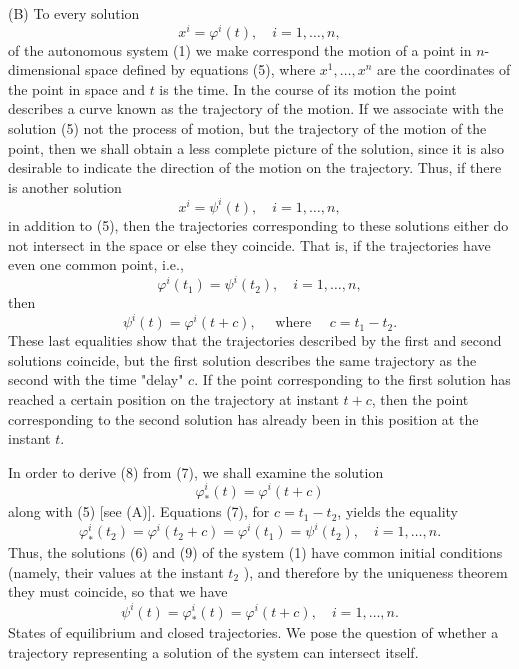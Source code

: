 \documentclass[10pt,a5paper]{book}
\theoremstyle{plain}
\theoremstyle{definition}
\theoremstyle{remark}
\begin{document}
(B) To every solution
\begin{equation*}
x^{i}=\varphi^{i}(t), \quad i=1, \ldots, n, \tag{5}
\end{equation*}
of the autonomous system (1) we make correspond the motion of a point in $n$-dimensional space defined by equations (5), where $x^{1}, \ldots, x^{n}$ are the coordinates of the point in space and $t$ is the time. In the course of its motion the point describes a curve known as the trajectory of the motion. If we associate with the solution (5) not the process of motion, but the trajectory of the motion of the point, then we shall obtain a less complete picture of the solution, since it is also desirable to indicate the direction of the motion on the trajectory. Thus, if there is another solution
\begin{equation*}
x^{i}=\psi^{i}(t), \quad i=1, \ldots, n, \tag{6}
\end{equation*}
in addition to (5), then the trajectories corresponding to these solutions either do not intersect in the space or else they coincide. That is, if the trajectories have even one common point, i.e.,
\begin{equation*}
\varphi^{i}\left(t_{1}\right)=\psi^{i}\left(t_{2}\right), \quad i=1, \ldots, n, \tag{7}
\end{equation*}
then
\begin{equation*}
\psi^{i}(t)=\varphi^{i}(t+c), \quad \text { where } \quad c=t_{1}-t_{2} . \tag{8}
\end{equation*}
These last equalities show that the trajectories described by the first and second solutions coincide, but the first solution describes the same trajectory as the second with the time "delay" $c$. If the point corresponding to the first solution has reached a certain position on the trajectory at instant $t+c$, then the point corresponding to the second solution has already been in this position at the instant $t$.

In order to derive (8) from (7), we shall examine the solution
\begin{equation*}
\varphi_{*}^{i}(t)=\varphi^{i}(t+c) \tag{9}
\end{equation*}
along with (5) [see (A)]. Equations (7), for $c=t_{1}-t_{2}$, yields the equality
\[
\varphi_{*}^{i}\left(t_{2}\right)=\varphi^{i}\left(t_{2}+c\right)=\varphi^{i}\left(t_{1}\right)=\psi^{i}\left(t_{2}\right), \quad i=1, \ldots, n .
\]
Thus, the solutions (6) and (9) of the system (1) have common initial conditions (namely, their values at the instant $t_{2}$ ), and therefore by the uniqueness theorem they must coincide, so that we have
\[
\psi^{i}(t)=\varphi_{*}^{i}(t)=\varphi^{i}(t+c), \quad i=1, \ldots, n .
\]
States of equilibrium and closed trajectories. We pose the question of whether a trajectory representing a solution of the system can intersect itself.
\end{document}
